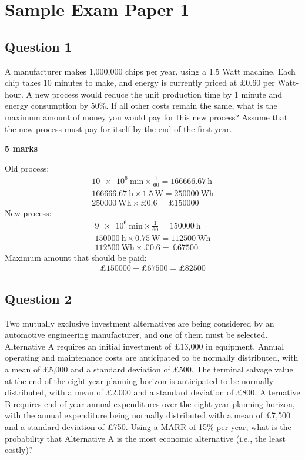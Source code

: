 \chapter{Sample Exam Paper 1}
\section{Question 1}
A manufacturer makes 1,000,000 chips per year, using a 1.5 Watt machine. Each chip takes 10 minutes to make, and energy is currently priced at \pounds 0.60 per Watt-hour. A new process would reduce the unit production time by 1 minute and energy consumption by 50\%. If all other costs remain the same, what is the maximum amount of money you would pay for this new process? Assume that the new process must pay for itself by the end of the first year.

\textbf{5 marks}

Old process:
\begin{gather}
    \SI{10e6}{\minute}\times \frac{1}{60} = \SI{166666.67}{\hour}\\
    \SI{166666.67}{\hour} \times \SI{1.5}{\watt} = \SI{250000}{\watt\hour}\\
    \SI{250000}{\watt\hour} \times \pounds 0.6 = \pounds 150000
\end{gather}
New process:
\begin{gather}
    \SI{9e6}{\minute}\times \frac{1}{60} = \SI{150000}{\hour}\\
    \SI{150000}{\hour} \times \SI{0.75}{\watt} = \SI{112500}{\watt\hour}\\
    \SI{112500}{\watt\hour} \times \pounds 0.6 = \pounds 67500
\end{gather}
Maximum amount that should be paid:
\begin{gather}
    \pounds 150000 - \pounds 67500 = \pounds 82500
\end{gather}
\section{Question 2}
Two mutually exclusive investment alternatives are being considered by an automotive engineering manufacturer, and one of them must be selected.
Alternative A requires an initial investment of \pounds 13,000 in equipment. Annual operating and maintenance costs are anticipated to be normally distributed, with a mean of \pounds 5,000 and a standard deviation of \pounds 500. The terminal salvage value at the end of the eight-year planning horizon is anticipated to be normally distributed, with a mean of \pounds 2,000 and a standard deviation of \pounds 800. Alternative B requires end-of-year annual expenditures over the eight-year planning horizon, with the annual expenditure being normally distributed with a mean of \pounds 7,500 and a standard deviation of \pounds 750. Using a MARR of 15\% per year, what is the probability that Alternative A is the most economic alternative (i.e., the least costly)?

